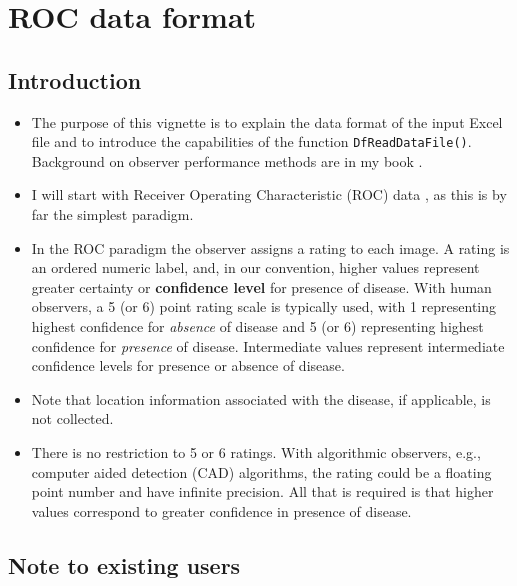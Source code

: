 \documentclass[]{book}
\providecommand{\tightlist}{%
  \setlength{\itemsep}{0pt}\setlength{\parskip}{0pt}}
\begin{document}
\hypertarget{rocdataformat}{%
\chapter{ROC data format}\label{rocdataformat}}

\hypertarget{introduction}{%
\section{Introduction}\label{introduction}}

\begin{itemize}
\tightlist
\item
  The purpose of this vignette is to explain the data format of the input Excel file and to introduce the capabilities of the function \texttt{DfReadDataFile()}. Background on observer performance methods are in my book \citep{RN2680}.
\item
  I will start with Receiver Operating Characteristic (ROC) data \citep{RN1766}, as this is by far the simplest paradigm.
\item
  In the ROC paradigm the observer assigns a rating to each image. A rating is an ordered numeric label, and, in our convention, higher values represent greater certainty or \textbf{confidence level} for presence of disease. With human observers, a 5 (or 6) point rating scale is typically used, with 1 representing highest confidence for \emph{absence} of disease and 5 (or 6) representing highest confidence for \emph{presence} of disease. Intermediate values represent intermediate confidence levels for presence or absence of disease.
\item
  Note that location information associated with the disease, if applicable, is not collected.
\item
  There is no restriction to 5 or 6 ratings. With algorithmic observers, e.g., computer aided detection (CAD) algorithms, the rating could be a floating point number and have infinite precision. All that is required is that higher values correspond to greater confidence in presence of disease.
\end{itemize}

\hypertarget{note-to-existing-users}{%
\section{Note to existing users}\label{note-to-existing-users}}
\end{document}
